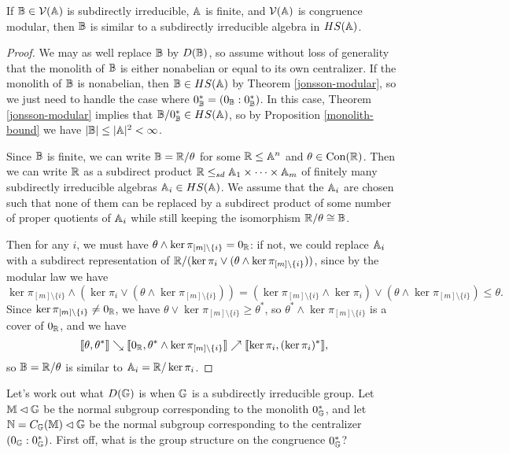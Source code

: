 \begin{appendices}
\begin{thm} If $\mathbb{B} \in \mathcal{V}(\mathbb{A})$ is subdirectly irreducible, $\mathbb{A}$ is finite, and $\mathcal{V}(\mathbb{A})$ is congruence modular, then $\mathbb{B}$ is similar to a subdirectly irreducible algebra in $HS(\mathbb{A})$.
\end{thm}
\begin{proof} We may as well replace $\mathbb{B}$ by $D(\mathbb{B})$, so assume without loss of generality that the monolith of $\mathbb{B}$ is either nonabelian or equal to its own centralizer. If the monolith of $\mathbb{B}$ is nonabelian, then $\mathbb{B} \in HS(\mathbb{A})$ by Theorem \ref{jonsson-modular}, so we just need to handle the case where $0_{\mathbb{B}}^* = (0_{\mathbb{B}} : 0_{\mathbb{B}}^*)$. In this case, Theorem \ref{jonsson-modular} implies that $\mathbb{B}/0_{\mathbb{B}}^* \in HS(\mathbb{A})$, so by Proposition \ref{monolith-bound} we have $|\mathbb{B}| \le |\mathbb{A}|^2 < \infty$.

Since $\mathbb{B}$ is finite, we can write $\mathbb{B} = \mathbb{R}/\theta$ for some $\mathbb{R} \le \mathbb{A}^n$ and $\theta \in \operatorname{Con}(\mathbb{R})$. Then we can write $\mathbb{R}$ as a subdirect product $\mathbb{R} \le_{sd} \mathbb{A}_1 \times \cdots \times \mathbb{A}_m$ of finitely many subdirectly irreducible algebras $\mathbb{A}_i \in HS(\mathbb{A})$. We assume that the $\mathbb{A}_i$ are chosen such that none of them can be replaced by a subdirect product of some number of proper quotients of $\mathbb{A}_i$ while still keeping the isomorphism $\mathbb{R}/\theta \cong \mathbb{B}$.

Then for any $i$, we must have $\theta \wedge \ker \pi_{[m]\setminus\{i\}} = 0_{\mathbb{R}}$: if not, we could replace $\mathbb{A}_i$ with a subdirect representation of $\mathbb{R}/(\ker \pi_i \vee (\theta \wedge \ker \pi_{[m]\setminus\{i\}}))$, since by the modular law we have
\[
\ker \pi_{[m]\setminus \{i\}} \wedge (\ker \pi_i \vee (\theta \wedge \ker \pi_{[m]\setminus\{i\}})) = (\ker \pi_{[m]\setminus \{i\}} \wedge \ker \pi_i) \vee (\theta \wedge \ker \pi_{[m]\setminus\{i\}}) \le \theta.
\]
Since $\ker \pi_{[m]\setminus \{i\}} \ne 0_{\mathbb{R}}$, we have $\theta \vee \ker \pi_{[m]\setminus \{i\}} \ge \theta^*$, so $\theta^* \wedge \ker \pi_{[m]\setminus \{i\}}$ is a cover of $0_{\mathbb{R}}$, and we have
\[
\llbracket \theta, \theta^* \rrbracket \searrow \llbracket 0_{\mathbb{R}}, \theta^* \wedge \ker \pi_{[m]\setminus \{i\}} \rrbracket \nearrow \llbracket \ker \pi_i, (\ker \pi_i)^* \rrbracket,
\]
so $\mathbb{B} = \mathbb{R}/\theta$ is similar to $\mathbb{A}_i = \mathbb{R}/\ker \pi_i$.
\end{proof}

\begin{ex} Let's work out what $D(\mathbb{G})$ is when $\mathbb{G}$ is a subdirectly irreducible group. Let $\mathbb{M} \lhd \mathbb{G}$ be the normal subgroup corresponding to the monolith $0_{\mathbb{G}}^*$, and let $\mathbb{N} = C_{\mathbb{G}}(\mathbb{M}) \lhd \mathbb{G}$ be the normal subgroup corresponding to the centralizer $(0_{\mathbb{G}} : 0_{\mathbb{G}}^*)$. First off, what is the group structure on the congruence $0_{\mathbb{G}}^*$?


\end{ex}
\end{appendices}
